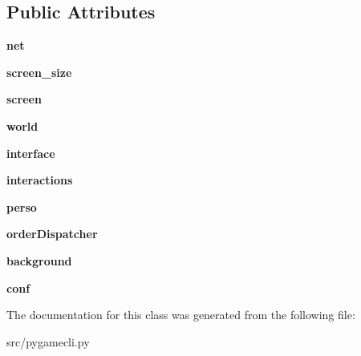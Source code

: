 \subsection*{Public Attributes}
\begin{DoxyCompactItemize}
\item 
\hypertarget{classsrc_1_1pygamecli_1_1_client_ac49bab3406de87eeebaf4ea517837174}{}\label{classsrc_1_1pygamecli_1_1_client_ac49bab3406de87eeebaf4ea517837174} 
{\bfseries net}
\item 
\hypertarget{classsrc_1_1pygamecli_1_1_client_a055195a715cdf33f61a51a45576465c4}{}\label{classsrc_1_1pygamecli_1_1_client_a055195a715cdf33f61a51a45576465c4} 
{\bfseries screen\+\_\+size}
\item 
\hypertarget{classsrc_1_1pygamecli_1_1_client_abd74a69bc51c1dbfd1cb9758a616f169}{}\label{classsrc_1_1pygamecli_1_1_client_abd74a69bc51c1dbfd1cb9758a616f169} 
{\bfseries screen}
\item 
\hypertarget{classsrc_1_1pygamecli_1_1_client_a8eedf3dd956cbda87e89c36382bdb7e5}{}\label{classsrc_1_1pygamecli_1_1_client_a8eedf3dd956cbda87e89c36382bdb7e5} 
{\bfseries world}
\item 
\hypertarget{classsrc_1_1pygamecli_1_1_client_a2505375869f2d55692ffd7568f9f8619}{}\label{classsrc_1_1pygamecli_1_1_client_a2505375869f2d55692ffd7568f9f8619} 
{\bfseries interface}
\item 
\hypertarget{classsrc_1_1pygamecli_1_1_client_a381386fd8e7db436983d574b1e570b6b}{}\label{classsrc_1_1pygamecli_1_1_client_a381386fd8e7db436983d574b1e570b6b} 
{\bfseries interactions}
\item 
\hypertarget{classsrc_1_1pygamecli_1_1_client_a2de426209a1bfad65e0a6e0a46303c33}{}\label{classsrc_1_1pygamecli_1_1_client_a2de426209a1bfad65e0a6e0a46303c33} 
{\bfseries perso}
\item 
\hypertarget{classsrc_1_1pygamecli_1_1_client_a1729cd39c4c6d865f6ab55e99d4c1487}{}\label{classsrc_1_1pygamecli_1_1_client_a1729cd39c4c6d865f6ab55e99d4c1487} 
{\bfseries order\+Dispatcher}
\item 
\hypertarget{classsrc_1_1pygamecli_1_1_client_a9ec2972091b06b16117f0baa1d65278b}{}\label{classsrc_1_1pygamecli_1_1_client_a9ec2972091b06b16117f0baa1d65278b} 
{\bfseries background}
\item 
\hypertarget{classsrc_1_1pygamecli_1_1_client_a6b36ebb195e6f899ef039dc5b09bb224}{}\label{classsrc_1_1pygamecli_1_1_client_a6b36ebb195e6f899ef039dc5b09bb224} 
{\bfseries conf}
\end{DoxyCompactItemize}


The documentation for this class was generated from the following file\+:\begin{DoxyCompactItemize}
\item 
src/pygamecli.\+py\end{DoxyCompactItemize}
